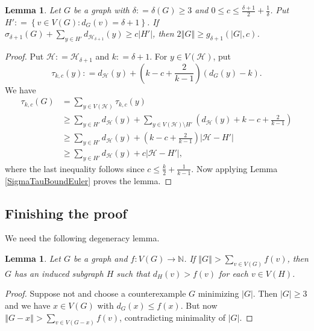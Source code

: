 \documentclass[12pt]{article}
\theoremstyle{plain}
\newtheorem{lem}[thm]{Lemma}
\theoremstyle{definition}
\theoremstyle{remark}
\newcommand{\fancy}[1]{\mathcal{#1}}
\newcommand{\IN}{\mathbb{N}}
\newcommand{\HH}{\fancy{H}}
\newcommand{\setb}[3]{\left\{ #1 \in #2 : #3 \right\}}
\newcommand{\card}[1]{\left|#1\right|}
\newcommand{\size}[1]{\left\Vert#1\right\Vert}
\newcommand{\func}[3]{#1\colon #2 \rightarrow #3}
\newcommand{\parens}[1]{\left( #1 \right)}
\newcommand{\DefinedAs}{\mathrel{\mathop:}=}
\begin{document}
\begin{lem}\label{SigmaTauBoundEulerRefined}
Let $G$ be a graph with $\delta \DefinedAs \delta(G) \ge 3$ and $0 \le c \le \frac{\delta + 1}{2} + \frac{1}{\delta}$.  Put $H' \DefinedAs \setb{v}{V(G)}{d_G(v) = \delta + 1}$.  If $\sigma_{\delta + 1}(G) +  \sum_{y \in H'} d_{\HH_{\delta + 1}}(y) \ge c\card{H'}$, then $2\size{G} \ge g_{\delta + 1}(\card{G}, c)$.	
\end{lem}
\begin{proof}
	Put $\HH \DefinedAs \HH_{\delta + 1}$ and $k \DefinedAs \delta + 1$.	For $y \in V(\HH)$, put 
	\[\tau_{k,c}(y) \DefinedAs d_{\HH}(y) + \parens{k-c + \frac{2}{k-1}}(d_G(y) - k).\]  We have 
	\begin{align*}
	\tau_{k,c}(G) &= \sum_{y \in V(\HH)} \tau_{k,c}(y)\\
	&\ge \sum_{y \in H'} d_{\HH}(y) + \sum_{y \in V(\HH) \setminus H'} \parens{d_{\HH}(y) + k-c + \frac{2}{k-1}}\\
	&\ge \sum_{y \in H'} d_{\HH}(y) + \parens{k-c + \frac{2}{k-1}}\card{\HH - H'}\\
	&\ge \sum_{y \in H'} d_{\HH}(y) + c\card{\HH - H'},
	\end{align*}
	where the last inequality follows since $c \le \frac{k}{2} + \frac{1}{k-1}$. Now applying Lemma \ref{SigmaTauBoundEuler} proves the lemma.
\end{proof}

\subsection{Finishing the proof}

\noindent We need the following degeneracy lemma.
\begin{lem}\label{DegenerateEuler}
Let $G$ be a graph and $\func{f}{V(G)}{\IN}$.  If $\size{G} > \sum_{v \in V(G)} f(v)$, then $G$ has an induced subgraph $H$ such that $d_H(v) > f(v)$ for each $v \in V(H)$.
\end{lem}
\begin{proof}
Suppose not and choose a counterexample $G$ minimizing $\card{G}$. Then $\card{G} \ge 3$ and we have $x \in V(G)$ with $d_G(x) \leq f(x)$. But now $\size{G-x} > \sum_{v \in V(G-x)} f(v)$, contradicting minimality of $\card{G}$.
\end{proof}
\end{document}
